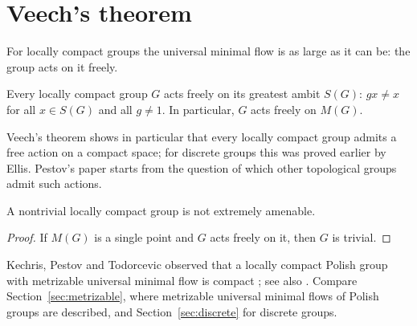\section{Veech's theorem}\label{sec:veech}

For locally compact groups the universal minimal flow is as large as it can
be: the group acts on it freely.

\begin{theorem}\label{thm:veech}
Every locally compact group $G$ acts freely on its greatest ambit $S(G)$:
$gx\neq x$ for all $x\in S(G)$ and all $g\neq 1$. In particular, $G$ acts
freely on $M(G)$.
\end{theorem}

\begin{remark}\label{rem:veech-history}
Veech's theorem shows in particular that every locally compact group admits a
free action on a compact space; for discrete groups this was proved earlier by
Ellis. Pestov's paper \cite{Pestov1998} starts from the question of which
other topological groups admit such actions.
\end{remark}

\begin{corollary}\label{cor:lc-not-ea}
A nontrivial locally compact group is not extremely amenable.
\end{corollary}

\begin{proof}
If $M(G)$ is a single point and $G$ acts freely on it, then $G$ is trivial.
\end{proof}

\begin{remark}\label{rem:lc-metrizable}
Kechris, Pestov and Todorcevic observed that a locally compact Polish group
with metrizable universal minimal flow is compact \cite{KPT2005}; see also
\cite{BYMT2017}. Compare Section~\ref{sec:metrizable}, where metrizable
universal minimal flows of Polish groups are described, and
Section~\ref{sec:discrete} for discrete groups.
\end{remark}
